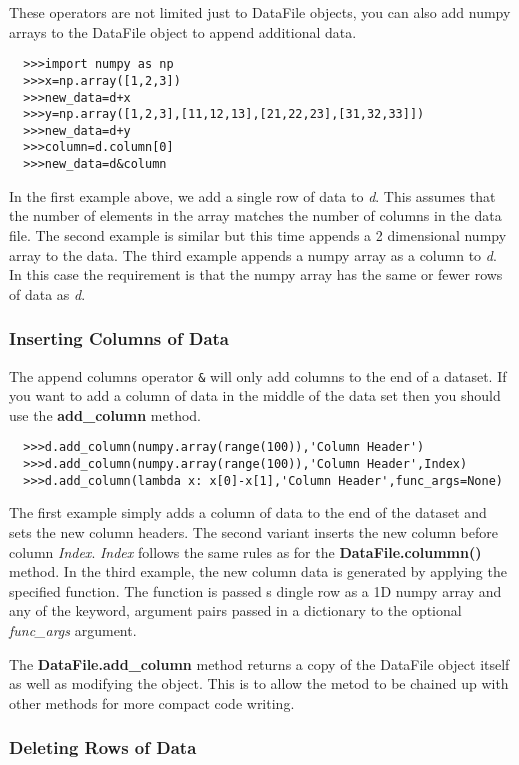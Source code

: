 \documentclass[a4paper,11pt]{scrartcl}
\begin{document}
These operators are not limited just to DataFile objects, you can also add numpy arrays to the DataFile object to append additional data.
\begin{verbatim}
  >>>import numpy as np
  >>>x=np.array([1,2,3])
  >>>new_data=d+x
  >>>y=np.array([1,2,3],[11,12,13],[21,22,23],[31,32,33]])
  >>>new_data=d+y
  >>>column=d.column[0]
  >>>new_data=d&column
\end{verbatim}
In the first example above, we add a single row of data to \textit{d}. This assumes that the number of elements in the array matches the number of columns in the data file. The second example is similar but this time appends a 2 dimensional numpy array to the data. The third example appends a numpy array as a column to \textit{d}. In this case the requirement is that the numpy array has the same or fewer rows of data as \textit{d}.

\subsubsection{Inserting Columns of Data}

The append columns operator \verb#&# will only add columns to the end of a dataset. If you want to add a column of data in the middle of the data set then you should use the \textbf{add\_column} method.

\begin{verbatim}
  >>>d.add_column(numpy.array(range(100)),'Column Header')
  >>>d.add_column(numpy.array(range(100)),'Column Header',Index)
  >>>d.add_column(lambda x: x[0]-x[1],'Column Header',func_args=None)
\end{verbatim}

The first example simply adds a column of data to the end of the dataset and sets the new column headers. The second variant  inserts the new column before column \textit{Index}. \textit{Index} follows the same rules as for the \textbf{DataFile.colummn()} method. In the third example, the new column data is generated by applying the specified function. The function is passed s dingle row as a 1D numpy array and any of the keyword, argument pairs passed in a dictionary to the optional \textit{func\_args} argument.

The \textbf{DataFile.add\_column} method returns a copy of the DataFile object itself as well as modifying the object. This is to allow the metod to be chained up with other methods for more compact code writing.

\subsubsection{Deleting Rows of Data}
\end{document}
